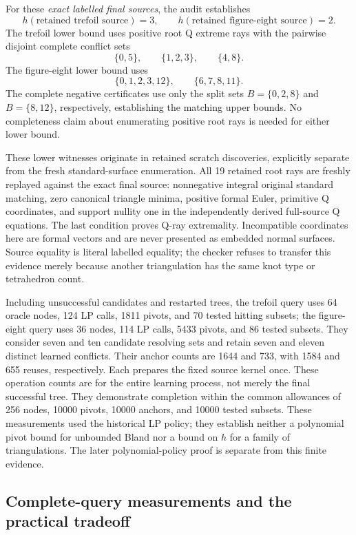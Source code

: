 For these \emph{exact labelled final sources}, the audit establishes
\[
 h(\text{retained trefoil source})=3,
 \qquad
 h(\text{retained figure-eight source})=2.
\]
The trefoil lower bound uses positive root Q extreme rays with the pairwise
disjoint complete conflict sets
\[
 \{0,5\},\qquad \{1,2,3\},\qquad \{4,8\}.
\]
The figure-eight lower bound uses
\[
 \{0,1,2,3,12\},\qquad \{6,7,8,11\}.
\]
The complete negative certificates use only the split sets
$B=\{0,2,8\}$ and $B=\{8,12\}$, respectively, establishing the matching upper
bounds.  No completeness claim about enumerating positive root rays is
needed for either lower bound.

These lower witnesses originate in retained scratch discoveries, explicitly
separate from the fresh standard-surface enumeration.  All 19 retained root
rays are freshly replayed against the exact final source: nonnegative
integral original standard matching, zero canonical triangle minima,
positive formal Euler, primitive Q coordinates, and support nullity one in
the independently derived full-source Q equations.  The last condition proves
Q-ray extremality.  Incompatible coordinates here are formal vectors and are
never presented as embedded normal surfaces.  Source equality is literal
labelled equality; the checker refuses to transfer this evidence merely
because another triangulation has the same knot type or tetrahedron count.

Including unsuccessful candidates and restarted trees, the trefoil query
uses 64 oracle nodes, 124 LP calls, 1811 pivots, and 70 tested hitting subsets;
the figure-eight query uses 36 nodes, 114 LP calls, 5433 pivots, and 86 tested
subsets.  They consider seven and ten candidate resolving sets and retain
seven and eleven distinct learned conflicts.  Their anchor counts are 1644
and 733, with 1584 and 655 reuses, respectively.  Each prepares the fixed
source kernel once.  These operation counts are for the entire learning
process, not merely the final successful tree.  They demonstrate completion
within the common allowances of 256 nodes, 10000 pivots, 10000 anchors, and
10000 tested subsets.  These measurements used the historical LP policy;
they establish neither a polynomial pivot bound for unbounded Bland nor a
bound on $h$ for a family of triangulations.  The later polynomial-policy
proof is separate from this finite evidence.

\subsection{Complete-query measurements and the practical tradeoff}

